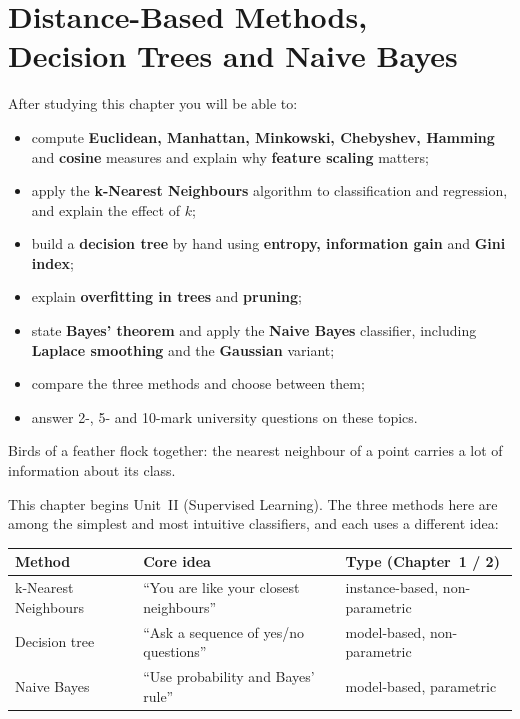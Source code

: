 \chapter[Distance-Based Methods, Decision Trees and Naive Bayes]{Distance-Based Methods,\\Decision Trees and Naive Bayes}
\label{ch:knn}
\begin{objectives}
After studying this chapter you will be able to:
\begin{itemize}
  \item compute \textbf{Euclidean, Manhattan, Minkowski, Chebyshev, Hamming} and \textbf{cosine} measures and explain why \textbf{feature scaling} matters;
  \item apply the \textbf{k-Nearest Neighbours} algorithm to classification and regression, and explain the effect of $k$;
  \item build a \textbf{decision tree} by hand using \textbf{entropy, information gain} and \textbf{Gini index};
  \item explain \textbf{overfitting in trees} and \textbf{pruning};
  \item state \textbf{Bayes' theorem} and apply the \textbf{Naive Bayes} classifier, including \textbf{Laplace smoothing} and the \textbf{Gaussian} variant;
  \item compare the three methods and choose between them;
  \item answer 2-, 5- and 10-mark university questions on these topics.
\end{itemize}
\end{objectives}

\begin{pullquote}
Birds of a feather flock together: the nearest neighbour of a point carries a lot of information about its class.
\end{pullquote}

This chapter begins Unit~II (Supervised Learning). The three methods here are among the simplest and most intuitive classifiers, and each uses a different idea:

\begin{center}
\begin{tabular}{@{}lll@{}}
\toprule
\textbf{Method} & \textbf{Core idea} & \textbf{Type (Chapter~1 / 2)}\\
\midrule
k-Nearest Neighbours & ``You are like your closest neighbours'' & instance-based, non-parametric\\
Decision tree & ``Ask a sequence of yes/no questions'' & model-based, non-parametric\\
Naive Bayes & ``Use probability and Bayes' rule'' & model-based, parametric\\
\bottomrule
\end{tabular}
\end{center}

